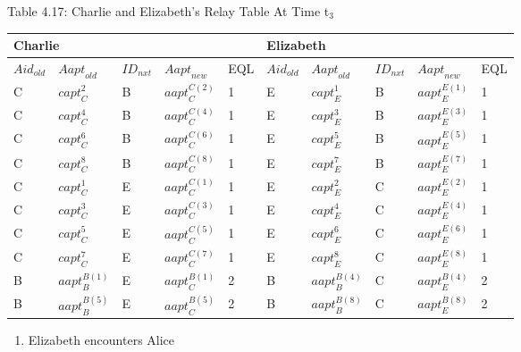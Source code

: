 Table 4.17: Charlie and Elizabeth's Relay Table At Time t${}_{3}$

\begin{tabular}{|p{0.4in}|p{0.5in}|p{0.3in}|p{0.5in}|p{0.3in}|p{0.4in}|p{0.5in}|p{0.3in}|p{0.5in}|p{0.3in}|} \hline 
\multicolumn{5}{|p{1in}|}{Charlie} & \multicolumn{5}{|p{1.9in}|}{Elizabeth} \\ \hline 
${Aid}_{old}$ & ${Aapt}_{old}$ & ${ID}_{nxt}$ & ${Aapt}_{new}$ & EQL & ${Aid}_{old}$ & ${Aapt}_{old}$ & ${ID}_{nxt}$ & ${Aapt}_{new}$ & EQL \\ \hline 
C & ${capt}^2_C$ & B & ${aapt}^{C\left(2\right)}_C$ & 1 & E & ${capt}^1_E$ & B & ${aapt}^{E\left(1\right)}_E$ & 1 \\ \hline 
C & ${capt}^4_C$ & B & ${aapt}^{C\left(4\right)}_C$ & 1 & E & ${capt}^3_E$ & B & ${aapt}^{E\left(3\right)}_E$ & 1 \\ \hline 
C & ${capt}^6_C$ & B & ${aapt}^{C\left(6\right)}_C$ & 1 & E & ${capt}^5_E$ & B & ${aapt}^{E\left(5\right)}_E$ & 1 \\ \hline 
C & ${capt}^8_C$ & B & ${aapt}^{C\left(8\right)}_C$ & 1 & E & ${capt}^7_E$ & B & ${aapt}^{E\left(7\right)}_E$ & 1 \\ \hline 
C & ${capt}^1_C$ & E & ${aapt}^{C\left(1\right)}_C$ & 1 & E & ${capt}^2_E$ & C & ${aapt}^{E\left(2\right)}_E$ & 1 \\ \hline 
C & ${capt}^3_C$ & E & ${aapt}^{C\left(3\right)}_C$ & 1 & E & ${capt}^4_E$ & C & ${aapt}^{E\left(4\right)}_E$ & 1 \\ \hline 
C & ${capt}^5_C$ & E & ${aapt}^{C\left(5\right)}_C$ & 1 & E & ${capt}^6_E$ & C & ${aapt}^{E\left(6\right)}_E$ & 1 \\ \hline 
C & ${capt}^7_C$ & E & ${aapt}^{C\left(7\right)}_C$ & 1 & E & ${capt}^8_E$ & C & ${aapt}^{E\left(8\right)}_E$ & 1 \\ \hline 
B & ${aapt}^{B\left(1\right)}_B$ & E & ${aapt}^{B\left(1\right)}_C$ & 2 & B & ${aapt}^{B\left(4\right)}_B$ & C & ${aapt}^{B\left(4\right)}_E$ & 2 \\ \hline 
B & ${aapt}^{B\left(5\right)}_B$ & E & ${aapt}^{B\left(5\right)}_C$ & 2 & B & ${aapt}^{B\left(8\right)}_B$ & C & ${aapt}^{B\left(8\right)}_E$ & 2 \\ \hline 
\end{tabular}

\begin{enumerate}
\item  Elizabeth encounters Alice
\end{enumerate}

